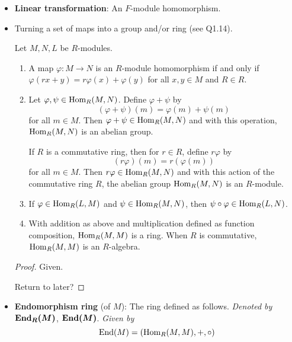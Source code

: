 \documentclass[../notes.tex]{subfiles}
\begin{document}
\begin{itemize}
\begin{enumerate}
\begin{itemize}
        \end{itemize}
    \end{enumerate}
    \item \textbf{Linear transformation}: An $F$-module homomorphism.
    \item Turning a set of maps into a group and/or ring (see Q1.14).
    \begin{proposition}\label{prp:10.2}
        Let $M,N,L$ be $R$-modules.
        \begin{enumerate}
            \item A map $\varphi:M\to N$ is an $R$-module homomorphism if and only if $\varphi(rx+y)=r\varphi(x)+\varphi(y)$ for all $x,y\in M$ and $R\in R$.
            \item Let $\varphi,\psi\in\operatorname{Hom}_R(M,N)$. Define $\varphi+\psi$ by
            \begin{equation*}
                (\varphi+\psi)(m) = \varphi(m)+\psi(m)
            \end{equation*}
            for all $m\in M$. Then $\varphi+\psi\in\operatorname{Hom}_R(M,N)$ and with this operation, $\operatorname{Hom}_R(M,N)$ is an abelian group.\par
            If $R$ is a commutative ring, then for $r\in R$, define $r\varphi$ by
            \begin{equation*}
                (r\varphi)(m) = r(\varphi(m))
            \end{equation*}
            for all $m\in M$. Then $r\varphi\in\operatorname{Hom}_R(M,N)$ and with this action of the commutative ring $R$, the abelian group $\operatorname{Hom}_R(M,N)$ is an $R$-module.
            \item If $\varphi\in\operatorname{Hom}_R(L,M)$ and $\psi\in\operatorname{Hom}_R(M,N)$, then $\psi\circ\varphi\in\operatorname{Hom}_R(L,N)$.
            \item With addition as above and multiplication defined as function composition, $\operatorname{Hom}_R(M,M)$ is a ring. When $R$ is commutative, $\operatorname{Hom}_R(M,M)$ is an $R$-algebra.
        \end{enumerate}
        \begin{proof}
            Given.\par
            Return to later?
        \end{proof}
    \end{proposition}
    \item \textbf{Endomorphism ring} (of $M$): The ring defined as follows. \emph{Denoted by} $\bm{\End_R(M)}$, $\bm{\End(M)}$. \emph{Given by}
    \begin{equation*}
        \End(M) = (\Hom_R(M,M),+,\circ)

\end{equation*}
\end{itemize}
\end{document}
